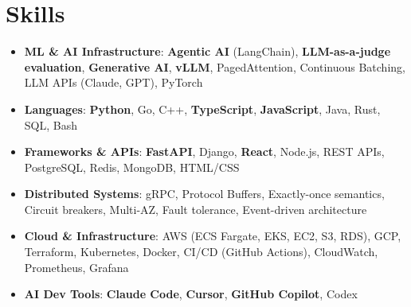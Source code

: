 \documentclass[letterpaper,11pt]{article}
\newcommand{\resumeSubHeadingListStart}{\begin{itemize}[leftmargin=0.15in, label={}]}
\newcommand{\resumeSubHeadingListEnd}{\end{itemize}}
\newcommand{\resumeSkillHeading}[2]{%
  \item\small{\textbf{#1}: #2 \vspace{-9pt}}%
}
\begin{document}
\section{Skills}
  \resumeSubHeadingListStart
    \resumeSkillHeading{ML \& AI Infrastructure}{\textbf{Agentic AI} (LangChain), \textbf{LLM-as-a-judge evaluation}, \textbf{Generative AI}, \textbf{vLLM}, PagedAttention, Continuous Batching, LLM APIs (Claude, GPT), PyTorch}
    \resumeSkillHeading{Languages}{\textbf{Python}, Go, C++, \textbf{TypeScript}, \textbf{JavaScript}, Java, Rust, SQL, Bash}
    \resumeSkillHeading{Frameworks \& APIs}{\textbf{FastAPI}, Django, \textbf{React}, Node.js, REST APIs, PostgreSQL, Redis, MongoDB, HTML/CSS}
    \resumeSkillHeading{Distributed Systems}{gRPC, Protocol Buffers, Exactly-once semantics, Circuit breakers, Multi-AZ, Fault tolerance, Event-driven architecture}
    \resumeSkillHeading{Cloud \& Infrastructure}{AWS (ECS Fargate, EKS, EC2, S3, RDS), GCP, Terraform, Kubernetes, Docker, CI/CD (GitHub Actions), CloudWatch, Prometheus, Grafana}
    \resumeSkillHeading{AI Dev Tools}{\textbf{Claude Code}, \textbf{Cursor}, \textbf{GitHub Copilot}, Codex}
  \resumeSubHeadingListEnd
\end{document}
